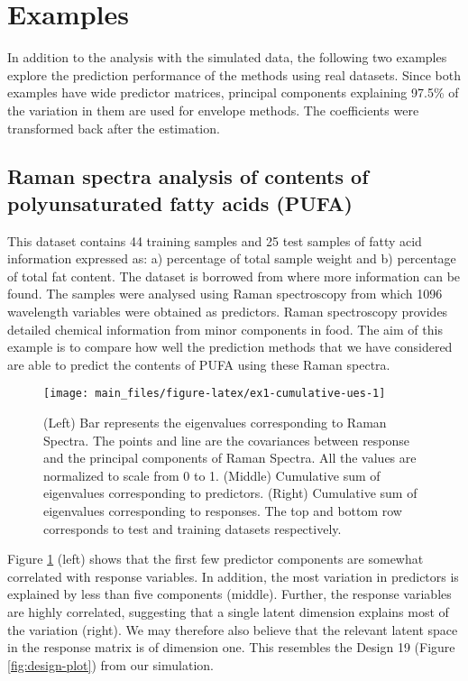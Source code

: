 \documentclass[review]{elsarticle}
\begin{document}
\section{Examples}\label{examples}

In addition to the analysis with the simulated data, the following two
examples explore the prediction performance of the methods using real
datasets. Since both examples have wide predictor matrices, principal
components explaining 97.5\% of the variation in them are used for
envelope methods. The coefficients were transformed back after the
estimation.

\subsection{Raman spectra analysis of contents of polyunsaturated fatty
acids
(PUFA)}\label{raman-spectra-analysis-of-contents-of-polyunsaturated-fatty-acids-pufa}

This dataset contains 44 training samples and 25 test samples of fatty
acid information expressed as: a) percentage of total sample weight and
b) percentage of total fat content. The dataset is borrowed from
\citet{naes2013multi} where more information can be found. The samples
were analysed using Raman spectroscopy from which 1096 wavelength
variables were obtained as predictors. Raman spectroscopy provides
detailed chemical information from minor components in food. The aim of
this example is to compare how well the prediction methods that we have
considered are able to predict the contents of PUFA using these Raman
spectra.









\begin{figure}
\texttt{[image: main\_files/figure-latex/ex1-cumulative-ues-1]} \caption{(Left) Bar represents the eigenvalues
corresponding to Raman Spectra. The points and line are the covariances
between response and the principal components of Raman Spectra. All the
values are normalized to scale from 0 to 1. (Middle) Cumulative sum of
eigenvalues corresponding to predictors. (Right) Cumulative sum of
eigenvalues corresponding to responses. The top and bottom row
corresponds to test and training datasets respectively.}\label{fig:ex1-cumulative-ues}
\end{figure}

Figure \ref{fig:ex1-cumulative-ues} (left) shows that the first few
predictor components are somewhat correlated with response variables. In
addition, the most variation in predictors is explained by less than
five components (middle). Further, the response variables are highly
correlated, suggesting that a single latent dimension explains most of
the variation (right). We may therefore also believe that the relevant
latent space in the response matrix is of dimension one. This resembles
the Design 19 (Figure \ref{fig:design-plot}) from our simulation.
\end{document}
